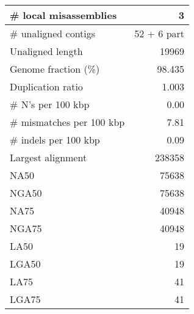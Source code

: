 \documentclass[12pt,a4paper]{article}
\begin{document}
\begin{table}[ht]
\begin{center}
\begin{tabular}{|l*{1}{|r}|}
\# local misassemblies & 3 \\ \hline
\# unaligned contigs & 52 + 6 part \\ \hline
Unaligned length & 19969 \\ \hline
Genome fraction (\%) & 98.435 \\ \hline
Duplication ratio & 1.003 \\ \hline
\# N's per 100 kbp & 0.00 \\ \hline
\# mismatches per 100 kbp & 7.81 \\ \hline
\# indels per 100 kbp & 0.09 \\ \hline
Largest alignment & 238358 \\ \hline
NA50 & 75638 \\ \hline
NGA50 & 75638 \\ \hline
NA75 & 40948 \\ \hline
NGA75 & 40948 \\ \hline
LA50 & 19 \\ \hline
LGA50 & 19 \\ \hline
LA75 & 41 \\ \hline
LGA75 & 41 \\ \hline
\end{tabular}
\end{center}
\end{table}
\end{document}
